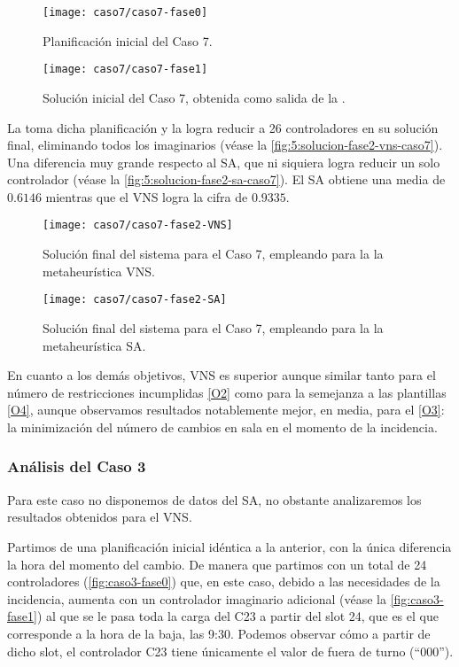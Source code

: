 \begin{figure}
	\centering
	\texttt{[image: caso7/caso7-fase0]}
	\caption{Planificación inicial del Caso 7.}
	\label{fig:5:solucion-inicial-caso7}
\end{figure}

\begin{figure}
	\centering
	\texttt{[image: caso7/caso7-fase1]}
	\caption{Solución inicial del Caso 7, obtenida como salida de la \faseuno{}.}
	\label{fig:5:solucion-fase1-caso7}
\end{figure}

La \fasedos{} toma dicha planificación y la logra reducir a 26 controladores en su solución final, eliminando todos los imaginarios (véase la \autoref{fig:5:solucion-fase2-vns-caso7}). Una diferencia muy grande respecto al SA, que ni siquiera logra reducir un solo controlador (véase la \autoref{fig:5:solucion-fase2-sa-caso7}). El SA obtiene una media de $0.6146$ mientras que el VNS logra la cifra de $0.9335$.

\begin{figure}
	\centering
	\texttt{[image: caso7/caso7-fase2-VNS]}
	\caption{Solución final del sistema para el Caso 7, empleando para la \fasedos{} la metaheurística VNS.}
	\label{fig:5:solucion-fase2-vns-caso7}
\end{figure}

\begin{figure}
	\centering
	\texttt{[image: caso7/caso7-fase2-SA]}
	\caption{Solución final del sistema para el Caso 7, empleando para la \fasedos{} la metaheurística SA.}
	\label{fig:5:solucion-fase2-sa-caso7}
\end{figure}

En cuanto a los demás objetivos, VNS es superior aunque similar tanto para el número de restricciones incumplidas \ref{O2} como para la semejanza a las plantillas \ref{O4}, aunque observamos resultados notablemente mejor, en media, para el \ref{O3}: la minimización del número de cambios en sala en el momento de la incidencia.

\subsubsection{Análisis del Caso 3}

Para este caso no disponemos de datos del SA, no obstante analizaremos los resultados obtenidos para el VNS.

Partimos de una planificación inicial idéntica a la anterior, con la única diferencia la hora del momento del cambio. De manera que partimos con un total de 24 controladores (\autoref{fig:caso3-fase0}) que, en este caso, debido a las necesidades de la incidencia, aumenta con un controlador imaginario adicional (véase la \autoref{fig:caso3-fase1}) al que se le pasa toda la carga del C23 a partir del slot 24, que es el que corresponde a la hora de la baja, las 9:30. Podemos observar cómo a partir de dicho slot, el controlador C23 tiene únicamente el valor de fuera de turno (``000'').

